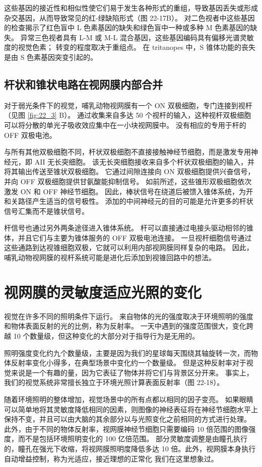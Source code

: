 这些基因的接近性和相似性使它们易于发生各种形式的重组，导致基因丢失或形成杂交基因，从而导致常见的红-绿缺陷形式（图 22-17B）。 对二色视者中这些基因的检查揭示了红色盲中 L 色素基因的缺失和绿色盲中一种或多种 M 色素基因的缺失。 异常三色视者具有 L-M 或 M-L 混合基因，这些基因编码具有偏移光谱灵敏度的视觉色素； 转变的程度取决于重组点。 在 tritanopes 中，S 锥体功能的丧失是由 S 色素基因突变引起的。

\subsection{杆状和锥状电路在视网膜内部合并}
对于弱光条件下的视觉，哺乳动物视网膜有一个 ON 双极细胞，专门连接到视杆（见图 \ref{fig:22_3} B）。 通过收集来自多达 50 个视杆的输入，这种视杆双极细胞可以将分散的单光子吸收效应集中在一小块视网膜中。 没有相应的专用于杆的 OFF 双极电池。

与所有其他双极细胞不同，杆状双极细胞不直接接触神经节细胞，而是激发专用神经元，即 AII 无长突细胞。 该无长突细胞接收来自多个杆状双极细胞的输入，并将其输出传送至锥状双极细胞。 它通过间隙连接向 ON 双极细胞提供兴奋信号，并向 OFF 双极细胞提供甘氨酸能抑制信号。 如前所述，这些锥形双极细胞依次激发 ON 和 OFF 神经节细胞。 因此，棒状信号在绕道后被馈入锥体系统，为开和关路径产生适当的信号极性。 添加的中间神经元的目的可能是允许更多的杆状信号汇集而不是锥状信号。

杆信号也通过另外两条途径进入锥体系统。 杆可以直接通过电接头驱动相邻的锥体，并且它们与主要为锥体服务的 OFF 双极电池连接。 一旦视杆细胞信号通过这些通路到达视锥细胞双极，它就可以利用内部视网膜同样复杂的电路。 因此，哺乳动物视网膜的视杆系统可能是进化后添加到视锥回路中的想法。


\section{视网膜的灵敏度适应光照的变化}
视觉在许多不同的照明条件下运行。 来自物体的光的强度取决于环境照明的强度和物体表面反射的光的比例，称为反射率。 一天中遇到的强度范围很大，变化跨越 10 个数量级，但这种变化的大部分对于指导行为是无用的。

照明强度变化约九个数量级，主要是因为我们的星球每天围绕其轴旋转一次，而物体反射率变化小得多，在典型场景中变化约一个数量级。 但是这种反射率对于视觉来说是一个有趣的量，因为它表征了物体并将它们与背景区分开来。 事实上，我们的视觉系统非常擅长独立于环境光照计算表面反射率（图 22-18）。

随着环境照明的整体增加，视觉场景中的所有点都以相同的因子变亮。 如果眼睛可以简单地将其灵敏度降低相同的因素，则图像的神经表征将在神经节细胞水平上保持不变，并且可以由大脑的其余部分以与光照变化之前相同的方式进行处理。 此外，由于不同的物体反射率，视网膜神经节细胞只需要编码 10 倍范围的图像强度，而不是包括环境照明变化的 100 亿倍范围。 部分灵敏度调整是由瞳孔执行的，瞳孔在强光下收缩，将视网膜照明度降低多达 10 倍。此外，视网膜本身执行自动增益控制，称为光适应，接近理想的正常化 我们在这里想象过。

